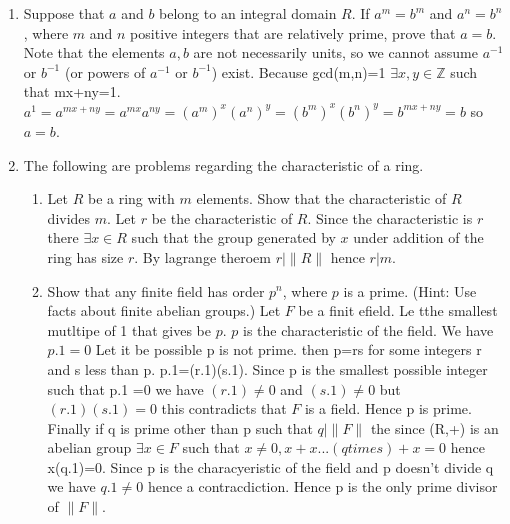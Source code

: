 \documentclass{article}
\newcommand{\ZZ}{\mathbb{Z}}
\newcommand{\inv}{^{-1}}
\begin{document}
\begin{enumerate}
    
    \item Suppose that $a$ and $b$ belong to an integral domain $R$. If $a^m=b^m$ and $a^n=b^n$, where $m$ and $n$ positive integers that are relatively prime, prove that $a=b$. Note that the elements $a,b$ are not necessarily units, so we cannot assume $a\inv$ or $b\inv$  (or powers of $a\inv$ or $b\inv$) exist. Because gcd(m,n)=1 $\exists x,y \in \ZZ$ such that mx+ny=1. $a^{1}=a^{mx+ny}=a^{mx}a^{ny}=(a^{m})^{x}(a^{n})^{y}=(b^{m})^{x}(b^{n})^{y}=b^{mx+ny}=b$ so $a=b$.
    
    \item The following are problems regarding the characteristic of a ring. 
    \begin{enumerate}
        \item Let $R$ be a ring with $m$ elements. Show that the characteristic of $R$ divides $m$. Let $r$ be the characteristic of $R$. Since the characteristic is $r$ there $\exists x \in R$ such that the group generated by $x$ under addition of the ring has size $r$. By lagrange theroem $r| \|R\|$ hence $r|m$. 
         
        \item Show that any finite field has order $p^n$, where $p$ is a prime. (Hint: Use facts about finite abelian groups.) Let $F$ be a finit efield. Le tthe smallest mutltipe of 1 that gives be $p$. $p$ is the characteristic of the field. We have $p.1=0$ Let it be possible p is not prime. then p=rs for some integers r and s less than p. p.1=(r.1)(s.1). Since p is the smallest possible integer such that p.1 =0 we have $(r.1)\neq0$ and $(s.1)\neq0$ but $(r.1)(s.1)=0$ this contradicts that $F$ is a field. Hence p is prime. Finally if q is prime other than p such that $q|\|F\|$ the since (R,+) is an abelian group $\exists x \in F$ such that $x\neq0, x+x...(q times)+x = 0$ hence x(q.1)=0. Since p is the characyeristic of the field and p doesn't divide q we have $q.1\neq0$ hence a contracdiction. Hence p is the only prime divisor of $\|F\|$.
        
    \end{enumerate}
\end{enumerate}
\end{document}
